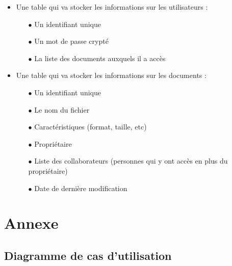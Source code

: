 	\begin{itemize}
		
		\item Une table qui va stocker les informations sur les utilisateurs : \par
		
		\begin{itemize}
			
			\item[$\bullet$] Un identifiant unique
			
			\item[$\bullet$] Un mot de passe crypté
			
			\item[$\bullet$] La liste des documents auxquels il a accès
			
		\end{itemize}
		
		\item Une table qui va stocker les informations sur les documents : \par
		
		\begin{itemize}
		
			\item[$\bullet$] Un identifiant unique
			
			\item[$\bullet$] Le nom du fichier
			
			\item[$\bullet$] Caractéristiques (format, taille, etc)
			
			\item[$\bullet$] Propriétaire
			
			\item[$\bullet$] Liste des collaborateurs (personnes qui y ont accès en plus du propriétaire)
			
			\item[$\bullet$] Date de dernière modification
		
		\end{itemize}
	
	\end{itemize}
	
	\newpage
	
	\section{Annexe}
	\appendix
	
	\subsection{Diagramme de cas d'utilisation}

